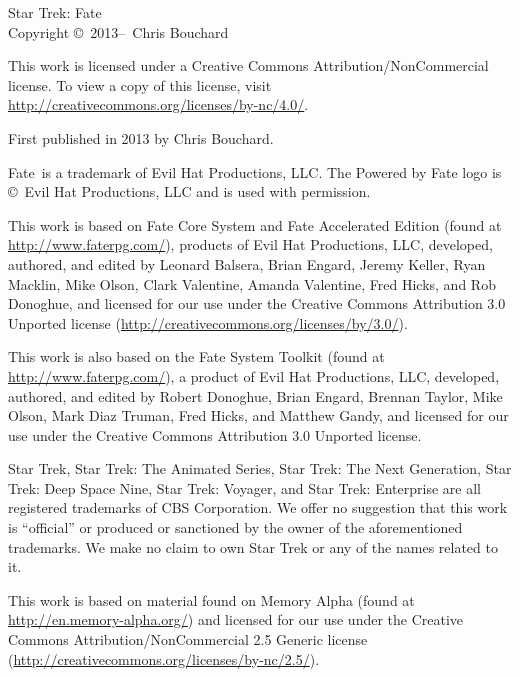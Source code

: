 \thispagestyle{empty}

\begin{center}
    \small\setlength{\parskip}{\baselineskip}
    Star Trek: Fate\\
    Copyright \copyright\ 2013--\the\year\ Chris Bouchard

    {\Huge\ccbync}

    This work is licensed under a Creative Commons Attribution\-/NonCommercial
    license. To view a copy of this license, visit
    \url{http://creativecommons.org/licenses/by-nc/4.0/}.

    First published in 2013 by Chris Bouchard.

    Fate\texttrademark\ is a trademark of Evil Hat Productions, LLC\@. The
    Powered by Fate logo is \copyright\ Evil Hat Productions, LLC and is used
    with permission.

    This work is based on Fate Core System and Fate Accelerated Edition (found
    at \url{http://www.faterpg.com/}), products of Evil Hat Productions, LLC,
    developed, authored, and edited by Leonard Balsera, Brian Engard, Jeremy
    Keller, Ryan Macklin, Mike Olson, Clark Valentine, Amanda Valentine, Fred
    Hicks, and Rob Donoghue, and licensed for our use under the Creative
    Commons Attribution 3.0 Unported license
    (\url{http://creativecommons.org/licenses/by/3.0/}).

    This work is also based on the Fate System Toolkit (found at
    \url{http://www.faterpg.com/}), a product of Evil Hat Productions, LLC,
    developed, authored, and edited by Robert Donoghue, Brian Engard, Brennan
    Taylor, Mike Olson, Mark Diaz Truman, Fred Hicks, and Matthew Gandy, and
    licensed for our use under the Creative Commons Attribution 3.0 Unported
    license.

    Star Trek, Star Trek: The Animated Series, Star Trek: The Next Generation,
    Star Trek: Deep Space Nine, Star Trek: Voyager, and Star Trek: Enterprise
    are all registered trademarks of CBS Corporation. We offer no suggestion
    that this work is ``official'' or produced or sanctioned by the owner of
    the aforementioned trademarks. We make no claim to own Star Trek or any of
    the names related to it.

    This work is based on material found on Memory Alpha (found at
    \url{http://en.memory-alpha.org/}) and licensed for our use under the
    Creative Commons Attribution\-/NonCommercial 2.5 Generic license
    (\url{http://creativecommons.org/licenses/by-nc/2.5/}).
\end{center}

